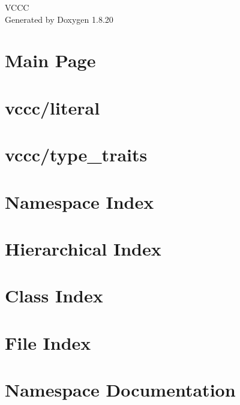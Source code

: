 \let\mypdfximage\pdfximage\def\pdfximage{\immediate\mypdfximage}\documentclass[twoside]{book}
\newcommand{\+}{\discretionary{\mbox{\scriptsize$\hookleftarrow$}}{}{}}
\newcommand{\clearemptydoublepage}{%
  \newpage{\pagestyle{empty}\cleardoublepage}%
}
\begin{document}
\hypersetup{pageanchor=false,
             bookmarksnumbered=true,
             pdfencoding=unicode
            }
\begin{titlepage}
\vspace*{7cm}
\begin{center}%
{\Large V\+C\+CC }\\
\vspace*{1cm}
{\large Generated by Doxygen 1.8.20}\\
\end{center}
\end{titlepage}
\clearemptydoublepage
{}
\tableofcontents
\clearemptydoublepage
{}
\hypersetup{pageanchor=true}

\chapter{Main Page}
\label{index}\hypertarget{index}{}
\chapter{vccc/literal}
\label{md_literal__r_e_a_d_m_e}

\chapter{vccc/type\+\_\+traits}
\label{md_type_traits__r_e_a_d_m_e}

\chapter{Namespace Index}

\chapter{Hierarchical Index}

\chapter{Class Index}

\chapter{File Index}

\chapter{Namespace Documentation}





\end{document}
